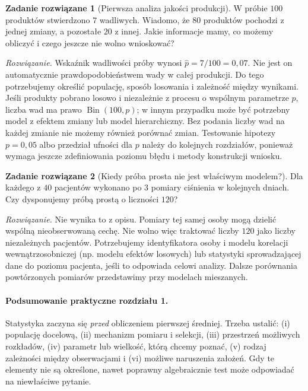 \documentclass[11pt,a4paper,oneside]{report}
\numberwithin{equation}{chapter}
\theoremstyle{plain}
\theoremstyle{definition}
\newtheorem{zadanie}{Zadanie rozwiązane}[chapter]
\theoremstyle{remark}
\DeclareMathOperator{\Bin}{Bin}
\begin{document}
\begin{zadanie}[Pierwsza analiza jakości produkcji]\label{zad:quality-case}
W próbie $100$ produktów stwierdzono $7$ wadliwych. Wiadomo, że $80$ produktów pochodzi z jednej zmiany, a pozostałe $20$ z innej. Jakie informacje mamy, co możemy obliczyć i czego jeszcze nie wolno wnioskować?
\par\emph{Rozwiązanie.} Wskaźnik wadliwości próby wynosi $\widehat p=7/100=0{,}07$. Nie jest on automatycznie prawdopodobieństwem wady w całej produkcji. Do tego potrzebujemy określić populację, sposób losowania i zależność między wynikami. Jeśli produkty pobrano losowo i niezależnie z procesu o wspólnym parametrze $p$, liczba wad ma prawo $\Bin(100,p)$; w innym przypadku może być potrzebny model z efektem zmiany lub model hierarchiczny. Bez podania liczby wad na każdej zmianie nie możemy również porównać zmian. Testowanie hipotezy $p=0{,}05$ albo przedział ufności dla $p$ należy do kolejnych rozdziałów, ponieważ wymaga jeszcze zdefiniowania poziomu błędu i metody konstrukcji wniosku.
\end{zadanie}

\begin{zadanie}[Kiedy próba prosta nie jest właściwym modelem?]
Dla każdego z $40$ pacjentów wykonano po $3$ pomiary ciśnienia w kolejnych dniach. Czy dysponujemy próbą prostą o liczności $120$?
\par\emph{Rozwiązanie.} Nie wynika to z opisu. Pomiary tej samej osoby mogą dzielić wspólną nieobserwowaną cechę. Nie wolno więc traktować liczby $120$ jako liczby niezależnych pacjentów. Potrzebujemy identyfikatora osoby i modelu korelacji wewnątrzosobniczej (np. modelu efektów losowych) lub statystyki sprowadzającej dane do poziomu pacjenta, jeśli to odpowiada celowi analizy. Dalsze porównania powtórzonych pomiarów przedstawimy przy modelach mieszanych.
\end{zadanie}

\paragraph{Podsumowanie praktyczne rozdziału 1.}
Statystyka zaczyna się \emph{przed} obliczeniem pierwszej średniej. Trzeba ustalić: (i) populację docelową, (ii) mechanizm pomiaru i selekcji, (iii) przestrzeń możliwych rozkładów, (iv) parametr lub wielkość, którą chcemy poznać, (v) rodzaj zależności między obserwacjami i (vi) możliwe naruszenia założeń. Gdy te elementy nie są określone, nawet poprawny algebraicznie test może odpowiadać na niewłaściwe pytanie.
\end{document}
